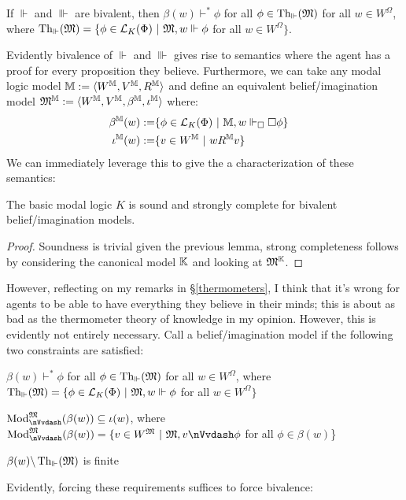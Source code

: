 \begin{corollary}
  If $\Vdash$ and $\Vvdash$ are bivalent, then $\beta (w) \vdash^{\ast} \phi$
  for all $\phi \in \tmop{Th}_{\Vdash} (\Omega)$ for all $w \in W^{\Omega}$,
  where $\tmop{Th}_{\Vdash} (\Omega) =\{\phi \in \mathcal{L}_K (\Phi)
  \  | \  \Omega, w \Vdash \phi$ for all $w \in W^{\Omega}
  \}$.
\end{corollary}

Evidently bivalence of $\Vdash$ and $\Vvdash$ gives rise to semantics where
the agent has a proof for every proposition they believe.   Furthermore, we
can take any modal logic model $\mathbbm{M} \assign \langle W^{\mathbbm{M}},
V^{\mathbbm{M}}, R^{\mathbbm{M}} \rangle$ and define an equivalent
belief/imagination model $\Omega^{\mathbbm{M}} \assign \langle
W^{\mathbbm{M}}, V^{\mathbbm{M}}, \beta^{\mathbbm{M}}, \iota^{\mathbbm{M}}
\rangle$ where:
\begin{eqnarray}
  \beta^{\mathbbm{M}} (w) \assign & \{\phi \in \mathcal{L}_K (\Phi) \ 
  | \  \mathbbm{M}, w \Vdash_{\Box} \Box \phi\} &  \nonumber\\
  \iota^{\mathbbm{M}} (w) \assign & \{v \in W^{\mathbbm{M}} \  |
  \  w R^{\mathbbm{M}} v\} &  \nonumber
\end{eqnarray}
We can immediately leverage this to give the a characterization of these
semantics:

\begin{proposition}
  The basic modal logic $K$ is sound and strongly complete for bivalent
  belief/imagination models.
\end{proposition}

\begin{proof}
  Soundness is trivial given the previous lemma, strong completeness follows
  by considering the canonical model $\mathbbm{K}$ and looking at
  $\Omega^{\mathbbm{K}}$. 
\end{proof}

However, reflecting on my remarks in \S\ref{thermometers}, I think that it's wrong for agents to be able to have
everything they believe in their minds; this is about as bad as the thermometer theory of knowledge
 in my opinion.   However, this is evidently not entirely necessary. Call a belief/imagination model
\tmtextit{reasonable} if the following two constraints are satisfied:
\begin{itemizedot}
  \item $\beta (w) \vdash^{\ast} \phi$ for all $\phi \in \tmop{Th}_{\Vdash}
  (\Omega)$ for all $w \in W^{\Omega}$, where $\tmop{Th}_{\Vdash} (\Omega)
  =\{\phi \in \mathcal{L}_K (\Phi) \  | \  \Omega, w \Vdash
  \phi$ for all $w \in W^{\Omega} \}$
  
  \item $\tmop{Mod}^{\Omega}_{{\nVvdash}} (\beta (w)) \subseteq \iota (w)$,
  where $\tmop{Mod}^{\Omega}_{{\nVvdash}} (\beta (w)) =\{v \in W^{\Omega}
  \  | \  \Omega, v {\nVvdash} \phi$ for all $\phi \in
  \beta (w)$\}
  
  \item $\beta (w) \backslash \tmop{Th}_{\Vdash} (\Omega)$ is finite
\end{itemizedot}
Evidently, forcing these requirements suffices to force bivalence:

